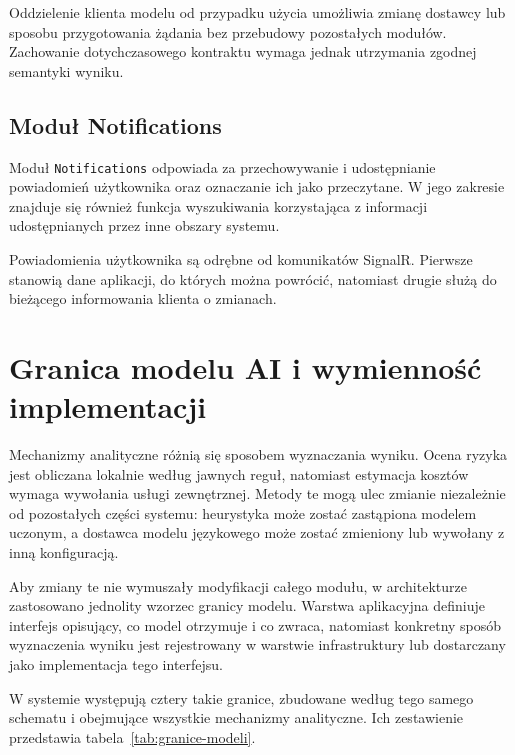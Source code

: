 Oddzielenie klienta modelu od przypadku użycia umożliwia zmianę dostawcy lub sposobu przygotowania żądania bez przebudowy pozostałych modułów. Zachowanie dotychczasowego kontraktu wymaga jednak utrzymania zgodnej semantyki wyniku.

\subsection{Moduł Notifications}

Moduł \texttt{Notifications} odpowiada za przechowywanie i udostępnianie powiadomień użytkownika oraz oznaczanie ich jako przeczytane. W jego zakresie znajduje się również funkcja wyszukiwania korzystająca z informacji udostępnianych przez inne obszary systemu.

Powiadomienia użytkownika są odrębne od komunikatów SignalR. Pierwsze stanowią dane aplikacji, do których można powrócić, natomiast drugie służą do bieżącego informowania klienta o zmianach.

\section{Granica modelu AI i wymienność implementacji}
\label{sec:granica-modelu-ai}

Mechanizmy analityczne różnią się sposobem wyznaczania wyniku. Ocena ryzyka jest obliczana lokalnie według jawnych reguł, natomiast estymacja kosztów wymaga wywołania usługi zewnętrznej. Metody te mogą ulec zmianie niezależnie od pozostałych części systemu: heurystyka może zostać zastąpiona modelem uczonym, a dostawca modelu językowego może zostać zmieniony lub wywołany z inną konfiguracją.

Aby zmiany te nie wymuszały modyfikacji całego modułu, w architekturze zastosowano jednolity wzorzec granicy modelu. Warstwa aplikacyjna definiuje interfejs opisujący, co model otrzymuje i co zwraca, natomiast konkretny sposób wyznaczenia wyniku jest rejestrowany w warstwie infrastruktury lub dostarczany jako implementacja tego interfejsu.

W systemie występują cztery takie granice, zbudowane według tego samego schematu i obejmujące wszystkie mechanizmy analityczne. Ich zestawienie przedstawia tabela~\ref{tab:granice-modeli}.

